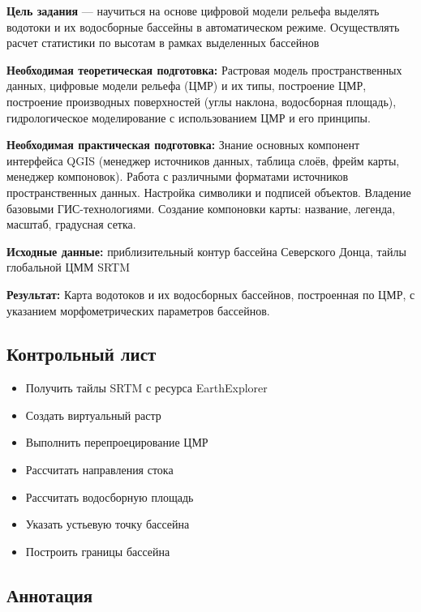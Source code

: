 \documentclass[
  12pt,
]{book}
\begin{document}
\textbf{Цель задания} --- научиться на основе цифровой модели рельефа выделять водотоки и их водосборные бассейны в автоматическом режиме. Осуществлять расчет статистики по высотам в рамках выделенных бассейнов

\textbf{Необходимая теоретическая подготовка:} Растровая модель пространственных данных, цифровые модели рельефа (ЦМР) и их типы, построение ЦМР, построение производных поверхностей (углы наклона, водосборная площадь), гидрологическое моделирование с использованием ЦМР и его принципы.

\textbf{Необходимая практическая подготовка:} Знание основных компонент интерфейса QGIS (менеджер источников данных, таблица слоёв, фрейм карты, менеджер компоновок). Работа с различными форматами источников пространственных данных. Настройка символики и подписей объектов. Владение базовыми ГИС-технологиями. Создание компоновки карты: название, легенда, масштаб, градусная сетка.

\textbf{Исходные данные:} приблизительный контур бассейна Северского Донца, тайлы глобальной ЦММ SRTM

\textbf{Результат:} Карта водотоков и их водосборных бассейнов, построенная по ЦМР, с указанием морфометрических параметров бассейнов.

\hypertarget{hydrodem-control}{%
\subsection{Контрольный лист}\label{hydrodem-control}}

\begin{itemize}
\item
  Получить тайлы SRTM с ресурса EarthExplorer
\item
  Создать виртуальный растр
\item
  Выполнить перепроецирование ЦМР
\item
  Рассчитать направления стока
\item
  Рассчитать водосборную площадь
\item
  Указать устьевую точку бассейна
\item
  Построить границы бассейна
\end{itemize}

\hypertarget{hydrodem-annotation}{%
\subsection{Аннотация}\label{hydrodem-annotation}}
\end{document}
